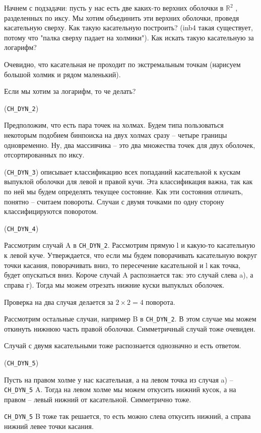 \documentclass[11pt]{article}
\begin{document}
Начнем с подзадачи: пусть у нас есть две каких-то верхних оболочки в
\(\mathbb{R}^2\) , разделенных по иксу. Мы хотим объединить эти верхних оболочки,
проведя касательную сверху. Как такую касательную построить? (inb4
такая существует, потому что "палка сверху падает на холмики"). Как
искать такую касательную за логарифм?

Очевидно, что касательная не проходит по экстремальным точкам
(нарисуем большой холмик и рядом маленький).

Если мы хотим за логарифм, то че делать?

(\texttt{CH\_DYN\_2})

Предположим, что есть пара точек на холмах. Будем типа пользоваться
некоторым подобием бинпоиска на двух холмах сразу -- четыре границы
одновременно. Ну, два массивчика -- это два множества точек для двух
оболочек, отсортированных по иксу.

(\texttt{CH\_DYN\_3}) описывает классификацию всех попаданий касательной к кускам
выпуклой оболочки для левой и правой кучи. Эта классификация важна,
так как по ней мы будем определять текущее состояние. Как эти
состояния отличать, понятно -- считаем повороты. Случаи с двумя
точками по одну сторону классифицируются поворотом.

(\texttt{CH\_DYN\_4})

Рассмотрим случай A в \texttt{CH\_DYN\_2}. Рассмотрим прямую l и какую-то
касательную к левой куче. Утверждается, что если мы будем
поворачивать касательную вокруг точки касания, поворачивать вниз, то
пересечение касательной и l как точка, будет опускаться вниз.
Короче случай A распознается так: это случай слева a), а справа
г). Тогда мы можем отрезать нижние куски выпуклых оболочек.

Проверка на два случая делается за \(2\times2 = 4\) поворота.

Рассмотрим остальные случаи, например B в \texttt{CH\_DYN\_2}. В этом случае мы
можем откинуть нижнюю часть правой оболочки. Симметричный случай
тоже очевиден.

Случай с двумя касательными тоже распознается однозначно и есть
ответом.

(\texttt{CH\_DYN\_5})

Пусть на правом холме у нас касательная, а на левом точка из случая
a) -- \texttt{CH\_DYN\_5} A. Тогда на левом холме мы можем откусить нижний
кусок, а на правом -- левый нижний от касательной. Симметрично тоже.

\texttt{CH\_DYN\_5} B тоже так решается, то есть можно слева откусить нижний, а
справа нижний левее точки касания.
\end{document}
